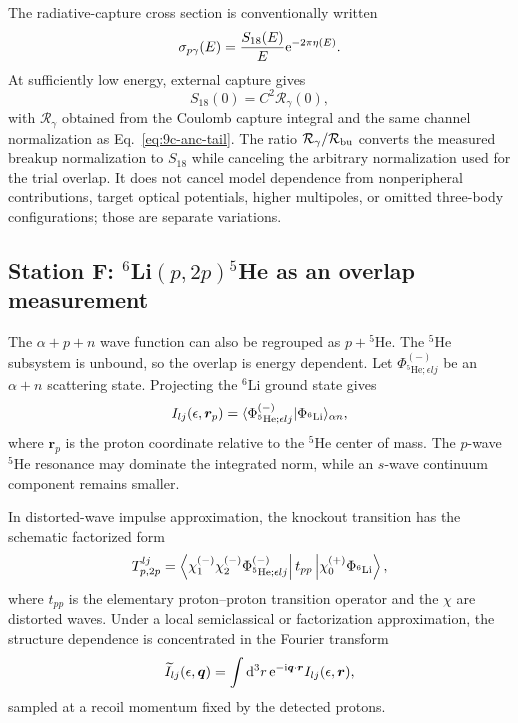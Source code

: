 The radiative-capture cross section is conventionally written
\begin{equation}
  \sigma_{p\gamma}(E)
  =\frac{S_{18}(E)}{E}\rme^{-2\pi\eta(E)}.
  \label{eq:S-factor-definition}
\end{equation}
At sufficiently low energy, external capture gives
\begin{equation}
  S_{18}(0)=C^2\mathcal R_\gamma(0),
  \label{eq:S18-ANC}
\end{equation}
with $\mathcal R_\gamma$ obtained from the Coulomb capture integral and the
same channel normalization as Eq.~\eqref{eq:9c-anc-tail}.  The ratio
$\mathcal R_\gamma/\vsub{\mathcal R}{bu}$ converts the measured breakup
normalization to $S_{18}$ while canceling the arbitrary normalization used for
the trial overlap.  It does not cancel model dependence from nonperipheral
contributions, target optical potentials, higher multipoles, or omitted
three-body configurations; those are separate variations.

\subsection{Station F:
\texorpdfstring{$^6$Li$(p,2p){}^5$He}{6Li(p,2p)5He} as an overlap measurement}
\label{subsec:lab-li6-p2p}

The $\alpha+p+n$ wave function can also be regrouped as $p+{}^5$He.  The
$^5$He subsystem is unbound, so the overlap is energy dependent.  Let
$\Phi_{{}^5\mathrm{He};\epsilon lj}^{(-)}$ be an $\alpha+n$ scattering state.
Projecting the $^6$Li ground state gives
\begin{equation}
  I_{lj}(\epsilon,\bm r_p)
  =\braket{
    \Phi_{{}^5\mathrm{He};\epsilon lj}^{(-)}
   |\Phi_{{}^6\mathrm{Li}}}_{\alpha n},
  \label{eq:li6-p5he-overlap}
\end{equation}
where $\bm r_p$ is the proton coordinate relative to the $^5$He center of
mass.  The $p$-wave $^5$He resonance may dominate the integrated norm, while
an $s$-wave continuum component remains smaller.

In distorted-wave impulse approximation, the knockout transition has the
schematic factorized form
\begin{align}
  T_{p,2p}^{lj}
  =\Bra{
  \chi_1^{(-)}\chi_2^{(-)}
  \Phi_{{}^5\mathrm{He};\epsilon lj}^{(-)}}
  t_{pp}
  \Ket{\chi_0^{(+)}\Phi_{{}^6\mathrm{Li}}},
  \label{eq:dwia-p2p-T}
\end{align}
where $t_{pp}$ is the elementary proton--proton transition operator and the
$\chi$ are distorted waves.  Under a local semiclassical or factorization
approximation, the structure dependence is concentrated in the Fourier
transform
\begin{equation}
  \widetilde I_{lj}(\epsilon,\bm q)
  =\int\rmd^3r\,
  \rme^{-\rmi\bm q\cdot\bm r}I_{lj}(\epsilon,\bm r),
  \label{eq:li6-overlap-momentum}
\end{equation}
sampled at a recoil momentum fixed by the detected protons.

